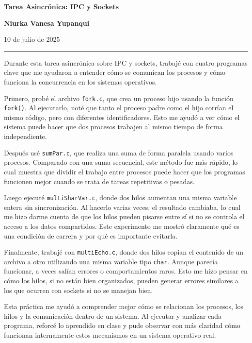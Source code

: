 \documentclass[11pt]{article}
\renewcommand{\maketitle}{
    \begin{center}
        {\LARGE \bfseries Tarea Asincrónica: IPC y Sockets \par}
        \vspace{0.5cm}
        {\large \textbf{Niurka Vanesa Yupanqui} \par}
        {\small  10 de julio de 2025 \par}
        \vspace{1cm}
        \hrule height 0.8pt
        \vspace{1cm}
    \end{center}
}
\begin{document}
\onehalfspacing
\pagestyle{empty}
\maketitle

Durante esta tarea asincrónica sobre IPC y sockets, trabajé con cuatro programas clave que me ayudaron a entender cómo se comunican los procesos y cómo funciona la concurrencia en los sistemas operativos.

Primero, probé el archivo \texttt{fork.c}, que crea un proceso hijo usando la función \texttt{fork()}. Al ejecutarlo, noté que tanto el proceso padre como el hijo corrían el mismo código, pero con diferentes identificadores. Esto me ayudó a ver cómo el sistema puede hacer que dos procesos trabajen al mismo tiempo de forma independiente.

Después usé \texttt{sumPar.c}, que realiza una suma de forma paralela usando varios procesos. Comparado con una suma secuencial, este método fue más rápido, lo cual muestra que dividir el trabajo entre procesos puede hacer que los programas funcionen mejor cuando se trata de tareas repetitivas o pesadas.

Luego ejecuté \texttt{multiSharVar.c}, donde dos hilos aumentan una misma variable entera sin sincronización. Al hacerlo varias veces, el resultado cambiaba, lo cual me hizo darme cuenta de que los hilos pueden pisarse entre sí si no se controla el acceso a los datos compartidos. Este experimento me mostró claramente qué es una condición de carrera y por qué es importante evitarla.

Finalmente, trabajé con \texttt{multiEcho.c}, donde dos hilos copian el contenido de un archivo a otro utilizando una misma variable tipo \texttt{char}. Aunque parecía funcionar, a veces salían errores o comportamientos raros. Esto me hizo pensar en cómo los hilos, si no están bien organizados, pueden generar errores similares a los que ocurren con sockets si no se manejan bien.

Esta práctica me ayudó a comprender mejor cómo se relacionan los procesos, los hilos y la
comunicación dentro de un sistema. Al ejecutar y analizar cada programa, reforcé lo aprendido en clase y pude observar con más claridad cómo funcionan internamente estos mecanismos en un sistema operativo real.
\end{document}
